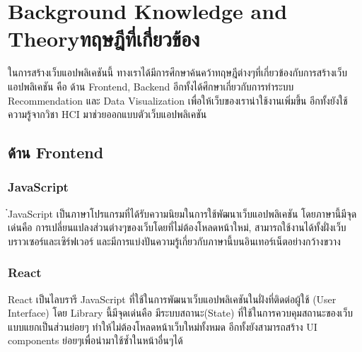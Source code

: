 \chapter{\ifenglish Background Knowledge and Theory\else ทฤษฎีที่เกี่ยวข้อง\fi}

ในการสร้างเว็บแอปพลิเคชันนี้ ทางเราได้มีการศึกษาค้นคว้าทฤษฎีต่างๆที่เกี่ยวข้องกับการสร้างเว็บแอปพลิเคชัน คือ ด้าน Frontend, Backend อีกทั้งได้ศึกษาเกี่ยวกับการทำระบบ Recommendation และ Data Visualization เพื่อให้เว็บของเราน่าใช้งานเพิ่มขึ้น
อีกทั้งยังใช้ความรู้จากวิชา HCI มาช่วยออกแบบตัวเว็บแอปพลิเคชัน


\section{ด้าน Frontend}
\subsection{JavaScript}
๋JavaScript เป็นภาษาโปรแกรมที่ได้รับความนิยมในการใช้พัฒนาเว็บแอปพลิเคชัน โดยภาษานี้มีจุดเด่นคือ
การเปลี่ยนแปลงส่วนต่างๆของเว็บโดยที่ไม่ต้องโหลดหน้าใหม่, สามารถใช้งานได้ทั้งฝั่งเว็บบราวเซอร์และเซิร์ฟเวอร์ และมีการแบ่งปันความรู้เกี่ยวกับภาษานี้บนอินเทอร์เน็ตอย่างกว้างขวาง
\cite{javascript}
\subsection{React}
React เป็นไลบรารี JavaScript ที่ใช้ในการพัฒนาเว็บแอปพลิเคชันในฝั่งที่ติดต่อผู้ใช้ (User Interface) โดย Library นี้มีจุดเด่นคือ มีระบบสถานะ(State) ที่ใช้ในการควบคุมสถานะของเว็บแบบแยกเป็นส่วนย่อยๆ ทำให้ไม่ต้องโหลดหน้าเว็บใหม่ทั้งหมด\cite{state}
อีกทั้งยังสามารถสร้าง UI components ย่อยๆเพื่อนำมาใช้ซ้ำในหน้าอื่นๆได้ \cite{react}

